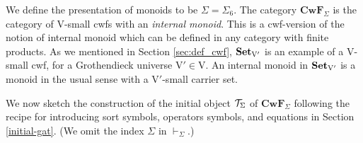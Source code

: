 \documentclass{mscs}
\newcommand{\FYI}[1]{{#1}}
\def\V{\mathrm{V}}
\def\Cwf{\mathbf{CwF}}
\begin{document}
We define the \FYI{presentation of} monoids to be $\Sigma = \Sigma_6$. The category $\Cwf_\Sigma$ is the category of $\V$-small cwfs with an {\em internal monoid}. This is a cwf-version of the notion of internal monoid which can be defined in any category with finite products. As we mentioned in Section \ref{sec:def_cwf}, $\Set_{\V'}$ is an example of a $\V$-small cwf, for a Grothendieck universe $\V' \in \V$. An internal monoid in $\Set_{\V'}$ is a monoid in the usual sense with a $\V'$-small carrier set.


We now sketch the construction of the initial object ${\mathcal T}_\Sigma$ of $\Cwf_\Sigma$ following the recipe for introducing sort symbols, operators symbols, and equations in Section \ref{initial-gat}. (We omit the index $\Sigma$ in $\vdash_\Sigma$.)
\end{document}
